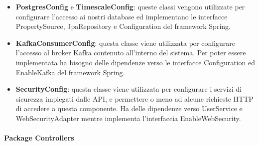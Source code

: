 		\begin{itemize}
			\item \textbf{PostgresConfig} e \textbf{TimescaleConfig}: queste classi vengono utilizzate per configurare l'accesso ai nostri database ed implementano le interfacce PropertySource, JpaRepository e Configuration del framework Spring. 
			\item \textbf{KafkaConsumerConfig}: questa classe viene utilizzata per configurare l'accesso al broker Kafka contenuto all'interno del sistema. Per poter essere implementata ha bisogno delle dipendenze verso le interfacce Configuration ed EnableKafka del framework Spring.
			\item \textbf{SecurityConfig}: questa classe viene utilizzata per configurare i servizi di sicurezza impiegati dalle API, e permettere o meno ad alcune richieste HTTP di accedere a questa componente. Ha delle dipendenze verso UserService e WebSecurityAdapter mentre implementa l'interfaccia EnableWebSecurity.
		\end{itemize}
		\newpage
		\paragraph*{Package Controllers}

